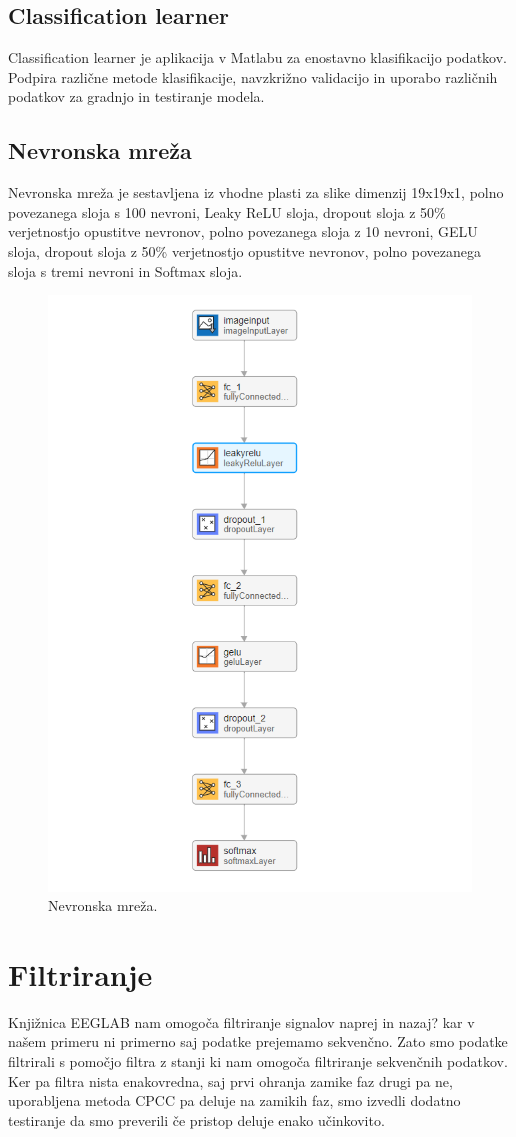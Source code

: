 \subsection{Classification learner}
Classification learner je aplikacija v Matlabu za enostavno klasifikacijo podatkov. Podpira različne metode klasifikacije, navzkrižno validacijo in uporabo različnih podatkov za gradnjo in testiranje modela.
\subsection{Nevronska mreža}
Nevronska mreža je sestavljena iz vhodne plasti za slike dimenzij 19x19x1, polno povezanega sloja s 100 nevroni, Leaky ReLU sloja, dropout sloja z 50\% verjetnostjo opustitve nevronov, polno povezanega sloja z 10 nevroni, GELU sloja, dropout sloja z 50\% verjetnostjo opustitve nevronov, polno povezanega sloja s tremi nevroni in Softmax sloja.
\begin{figure}[h!]
\begin{center}
\includegraphics[width=0.5\linewidth]{slike/Neural network.png}
\end{center}
\caption{Nevronska mreža.}
\end{figure}

\section{Filtriranje}
Knjižnica EEGLAB nam omogoča filtriranje signalov naprej in nazaj? kar v našem primeru ni primerno saj podatke prejemamo sekvenčno. Zato smo podatke filtrirali s pomočjo filtra z stanji ki nam omogoča filtriranje sekvenčnih podatkov. Ker pa filtra nista enakovredna, saj prvi ohranja zamike faz drugi pa ne, uporabljena metoda CPCC pa deluje na zamikih faz, smo izvedli dodatno testiranje da smo preverili če pristop deluje enako učinkovito.



